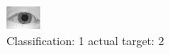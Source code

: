 \begin{figure}[h!]
\begin{center}
\includegraphics[width=0.60\columnwidth]{figures/ID1001_class_1_target_2.png}
\end{center}
\caption{ Classification: 1 actual target: 2}
\label{fig:ID1001_class_1_target_2}
\end{figure}
